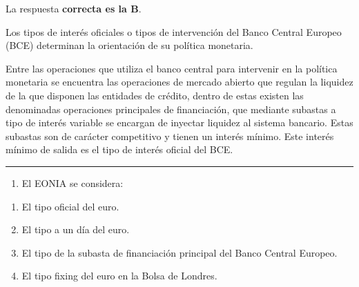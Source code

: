\documentclass[
  letterpaper,
  DIV=11,
  numbers=noendperiod]{scrreprt}
\providecommand{\tightlist}{%
  \setlength{\itemsep}{0pt}\setlength{\parskip}{0pt}}\usepackage{longtable,booktabs,array}
\begin{document}
\begin{tcolorbox}[enhanced jigsaw, left=2mm, opacityback=0, colback=white, breakable, arc=.35mm, bottomrule=.15mm, rightrule=.15mm, toprule=.15mm, leftrule=.75mm, colframe=quarto-callout-tip-color-frame]
\begin{minipage}[t]{5.5mm}
\textcolor{quarto-callout-tip-color}{\faLightbulb}
\end{minipage}%
\begin{minipage}[t]{\textwidth - 5.5mm}

La respuesta \textbf{correcta es la B}.

Los tipos de interés oficiales o tipos de intervención del Banco Central
Europeo (BCE) determinan la orientación de su política monetaria.

Entre las operaciones que utiliza el banco central para intervenir en la
política monetaria se encuentra las operaciones de mercado abierto que
regulan la liquidez de la que disponen las entidades de crédito, dentro
de estas existen las denominadas operaciones principales de
financiación, que mediante subastas a tipo de interés variable se
encargan de inyectar liquidez al sistema bancario. Estas subastas son de
carácter competitivo y tienen un interés mínimo. Este interés mínimo de
salida es el tipo de interés oficial del BCE.

\end{minipage}%
\end{tcolorbox}

\begin{center}\rule{0.5\linewidth}{0.5pt}\end{center}

\begin{enumerate}
\def\labelenumi{\arabic{enumi}.}
\setcounter{enumi}{2}
\tightlist
\item
  El EONIA se considera:
\end{enumerate}

\begin{enumerate}
\def\labelenumi{\alph{enumi})}
\item
  El tipo oficial del euro.
\item
  El tipo a un día del euro.
\item
  El tipo de la subasta de financiación principal del Banco Central
  Europeo.
\item
  El tipo fixing del euro en la Bolsa de Londres.
\end{enumerate}
\end{document}
